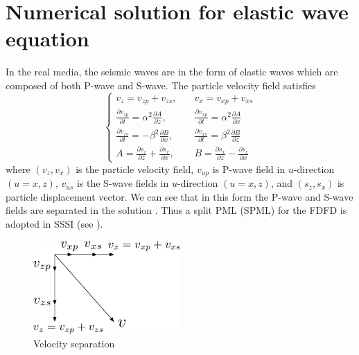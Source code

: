 \documentclass[11pt]{article}
\theoremstyle{plain}
\theoremstyle{definition}
\theoremstyle{remark}
\numberwithin{equation}{section}
\begin{document}
\section{Numerical solution for elastic wave equation}
In the real media, the seismic waves are in the form of elastic waves which are composed of both P-wave and S-wave. The particle velocity field satisfies 
\begin{equation}
    \left\{
    \begin{aligned}
    v_z=v_{zp}+v_{zs}, \quad &v_x=v_{xp}+v_{xs}\\
    \frac{\partial v_{zp}}{\partial t}=\alpha^2 \frac{\partial A}{\partial z}, \quad &\frac{\partial v_{xp}}{\partial t}=\alpha^2 \frac{\partial A}{\partial x}\\
    \frac{\partial v_{zs}}{\partial t}=-\beta^2 \frac{\partial B}{\partial x}, \quad &\frac{\partial v_{xs}}{\partial t}=\beta^2 \frac{\partial B}{\partial z}\\
    A=\frac{\partial s_z}{\partial z}+\frac{\partial s_x}{\partial x}, \quad &B=\frac{\partial s_x}{\partial z}-\frac{\partial s_z}{\partial x}
    \end{aligned}
    \right.
    \end{equation}
  where $(v_z, v_x)$ is the particle velocity field, $v_{up}$ is P-wave field in $u$-direction $(u=x, z)$,
  $v_{us}$ is the S-wave fields in $u$-direction $(u=x, z)$, and $(s_z, s_x)$ is particle displacement vector.
  We can see that in this form the P-wave and S-wave fields are separated in the solution \cite{Chen:2014aa}. Thus a split PML (SPML) for the FDFD is adopted in SSSI (see ).
    
\begin{figure}[htbp]
\centering
\includegraphics[width=0.5\textwidth]{Fig/EWCoordinates.pdf}
\caption{Velocity separation}
\end{figure}
\end{document}
